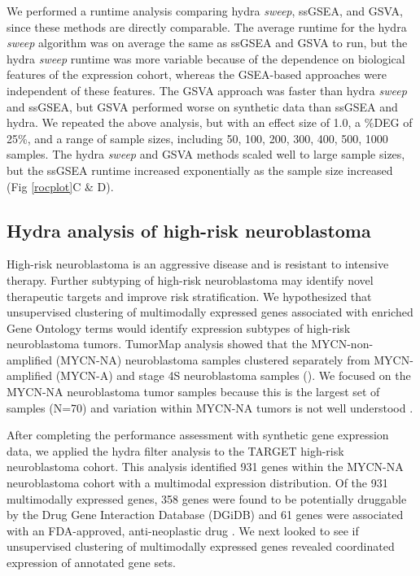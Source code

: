 \documentclass[10pt,letterpaper]{article}
\begin{document}
We performed a runtime analysis comparing hydra \textit{sweep}, ssGSEA, and GSVA, since these methods are directly comparable. The average runtime for the hydra \textit{sweep} algorithm was on average the same as ssGSEA and GSVA to run, but the hydra \textit{sweep} runtime was more variable because of the dependence on biological features of the expression cohort, whereas the GSEA-based approaches were independent of these features. The GSVA approach was faster than hydra \textit{sweep} and ssGSEA, but GSVA performed worse on synthetic data than ssGSEA and hydra. We repeated the above analysis, but with an effect size of 1.0, a \%DEG of 25\%, and a range of sample sizes, including  50, 100, 200, 300, 400, 500, 1000 samples. The hydra \textit{sweep} and GSVA methods scaled well to large sample sizes, but the ssGSEA runtime increased exponentially as the sample size increased (Fig \ref{rocplot}C \& D).  


\subsection*{Hydra analysis of high-risk neuroblastoma}
High-risk neuroblastoma is an aggressive disease and is resistant to intensive therapy. Further subtyping of high-risk neuroblastoma may identify novel therapeutic targets and improve risk stratification. We hypothesized that unsupervised clustering of multimodally expressed genes associated with enriched Gene Ontology terms would identify expression subtypes of high-risk neuroblastoma tumors. TumorMap  analysis \cite{newtonTumorMapExploringMolecular2017} showed that the MYCN-non-amplified (MYCN-NA) neuroblastoma samples clustered separately from MYCN-amplified (MYCN-A) and stage 4S neuroblastoma samples (). We focused on the MYCN-NA neuroblastoma tumor samples because this is the largest set of samples (N=70) and variation within MYCN-NA tumors is not well understood \cite{morgensternChallengeDefiningUltrahighrisk2019}.

After completing the performance assessment with synthetic gene expression data, we applied the hydra filter analysis to the TARGET high-risk neuroblastoma cohort. This analysis identified 931 genes within the MYCN-NA neuroblastoma cohort with a multimodal expression distribution. Of the 931 multimodally expressed genes, 358 genes were found to be potentially druggable by the Drug Gene Interaction Database (DGiDB) and 61 genes were associated with an FDA-approved, anti-neoplastic drug  \cite{cotto2017dgidb}. We next looked to see if unsupervised clustering of multimodally expressed genes revealed coordinated expression of annotated gene sets.
\end{document}

